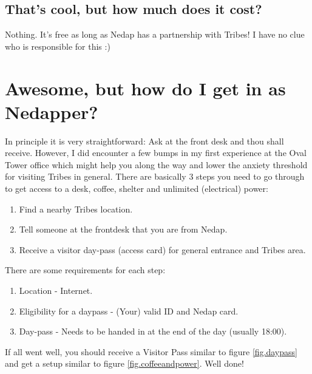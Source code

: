 \documentclass[11pt,a4paper,sans]{report} %
\begin{document}
\section{That's cool, but how much does it cost?}
Nothing. It's free as long as Nedap has a partnership with Tribes! I have no clue who is responsible for this :)

\chapter{Awesome, but how do I get in as Nedapper?}
In principle it is very straightforward: Ask at the front desk and thou shall receive. However, I did encounter a few bumps in my first experience at the Oval Tower office which might help you along the way and lower the anxiety threshold for visiting Tribes in general. There are basically 3 steps you need to go through to get access to a desk, coffee, shelter and unlimited (electrical) power:
\begin{enumerate}
	\item Find a nearby Tribes location.
	\item Tell someone at the frontdesk that you are from Nedap.
	\item Receive a visitor day-pass (access card) for general entrance and Tribes area.
\end{enumerate}
    
There are some requirements for each step:

\begin{enumerate}
	\item Location - Internet.
	\item Eligibility for a daypass - (Your) valid ID and Nedap card.
	\item Day-pass - Needs to be handed in at the end of the day (usually 18:00).
\end{enumerate}

If all went well, you should receive a Visitor Pass similar to figure \ref{fig.daypass} and get a setup similar to figure \ref{fig.coffeeandpower}. Well done!
\end{document}
